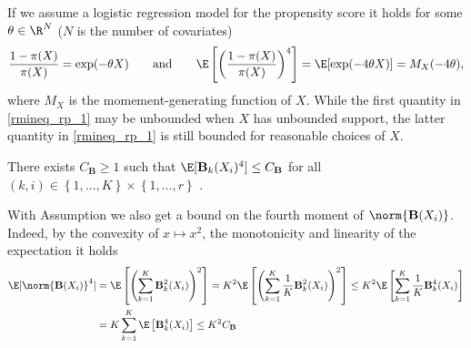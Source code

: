 \begin{remark}
  If we assume a logistic regression model for the propensity score
  it holds for some $\theta \in \R^N$ ($N$ is the number of covariates)
  \begin{gather}
    \label{rmineq_rp_1}
    \frac{1-\pi(X)}{\pi(X)}
    =
    \exp(-\theta X)
    \qquad
    \text{and}
    \qquad
    \E
    \left[ 
    \left(
    \frac{1-\pi(X)}{\pi(X)}
    \right)^4
    \right]
    =
    \E
    [
    \exp(-4\theta X)
    ]
    =
    M_X(-4\theta)
    ,
  \end{gather}
  where $M_X$ is the momement-generating function of $X$.
   While the first quantity in \eqref{rmineq_rp_1}
   may be unbounded when $X$ has unbounded support, the latter quantity in \eqref{rmineq_rp_1} is still bounded for reasonable choices of $X$.
\end{remark}
\begin{assumption}
  There exists $C_\mathbf{B} \ge 1$ such that
  $
  \E[
    \mathbf{B}_k(X_i)^4
  ]
  \le C_\mathbf{B}
  $
  for all $(k,i)\in \left\{ 1, \ldots, K \right\}\times \left\{ 1, \ldots, r \right\}$
  .
\end{assumption}
\begin{remark}
With Assumption we also get a bound on the fourth moment of 
  $
  \norm{\mathbf{B}(X_{i})}
  $. Indeed, by the convexity of 
  $x\mapsto x^2$, the monotonicity and linearity of the expectation it holds   
  \begin{align}
    \begin{split}
  \E[
  \norm{\mathbf{B}(X_{i})}^4
  ] 
  &=
  \E
  \left[ 
    \left( 
      \sum_{k=1}^{K}
      \mathbf{B}_k^2(X_i)
    \right)^2
  \right]
  =
  K^2
  \E
  \left[ 
    \left( 
      \sum_{k=1}^{K}
      \frac{1}{K}
      \mathbf{B}_k^2(X_i)
    \right)^2
  \right]
  \le
  K^2
  \E
  \left[ 
      \sum_{k=1}^{K}
      \frac{1}{K}
      \mathbf{B}_k^4(X_i)
  \right]
  \\
  &=
  K
  \sum_{k=1}^{K}
  \E
  \left[ 
      \mathbf{B}_k^4(X_i)
  \right]
  \le
  K^2 C_\mathbf{B}
  \end{split}
  \end{align}
\end{remark}
